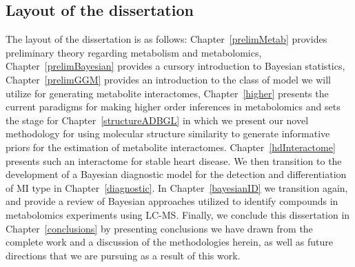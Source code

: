 \begin{DoubleSpace*}
\section{Layout of the dissertation}
The layout of the dissertation is as follows: Chapter~\ref{prelimMetab} provides preliminary theory regarding metabolism and metabolomics, Chapter~\ref{prelimBayesian} provides a cursory introduction to Bayesian statistics, Chapter~\ref{prelimGGM} provides an introduction to the class of model we will utilize for generating metabolite interactomes, Chapter~\ref{higher} presents the current paradigms for making higher order inferences in metabolomics and sets the stage for Chapter~\ref{structureADBGL} in which we present our novel methodology for using molecular structure similarity to generate informative priors for the estimation of metabolite interactomes. Chapter~\ref{hdInteractome} presents such an interactome for stable heart disease. We then transition to the development of a Bayesian diagnostic model for the detection and differentiation of MI type in Chapter~\ref{diagnostic}. In Chapter~\ref{bayesianID} we transition again, and provide a review of Bayesian approaches utilized to identify compounds in metabolomics experiments using LC-MS. Finally, we conclude this dissertation in Chapter~\ref{conclusions} by presenting conclusions we have drawn from the complete work and a discussion of the methodologies herein, as well as future directions that we are pursuing as a result of this work.
\end{DoubleSpace*}
\restoregeometry